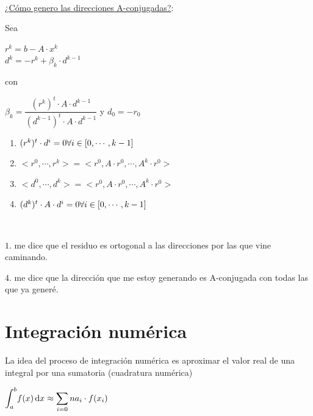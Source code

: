 \documentclass[]{article}
\begin{document}
~\newline
~\newline

\underline{¿Cómo genero las direcciones A-conjugadas?}:

Sea
\begin{center}
	$r^k = b-A\cdot x^k$ \\
	$d^k = -r^k + \beta_k \cdot d^{k-1}$
\end{center}
con
\begin{center}
	$\beta_k = \dfrac{(r^k)^t \cdot A \cdot  d^{k-1}}{(d^{k-1})^t \cdot  A \cdot d^{k-1}}$ \hspace{1cm} y \hspace{1cm} $d_0 = -r_0$
\end{center}

\begin{prop}
	\begin{enumerate}
		\item $(r^k)^t \cdot d^i = 0 \hfill \forall i \in [0,\cdots,k-1]$
		\item $<r^0,\cdots,r^k> = <r^0,A\cdot r^0,\cdots,A^k \cdot  r^0>$
		\item $<d^0,\cdots,d^k> = <r^0,A\cdot r^0,\cdots,A^k \cdot  r^0>$
		\item $(d^k)^t\cdot A\cdot d^i = 0 \hfill \forall i \in [0,\cdots,k-1]$
	\end{enumerate}
	~\newline

	$1.$ me dice que el residuo es ortogonal a las direcciones por las que vine caminando.

	$4.$ me dice que la dirección que me estoy generando es A-conjugada con todas las que ya generé.

\end{prop}

\newpage

%

\section{Integración numérica}
La idea del proceso de integración numérica es aproximar el valor real de una integral por una sumatoria (cuadratura numérica)
\begin{center}
	$\displaystyle \int_{a}^{b} \! f(x) \, \mathrm{d}x \approx \sum_{i=0}{n}{a_i\cdot f(x_i)}$
\end{center}
\end{document}
